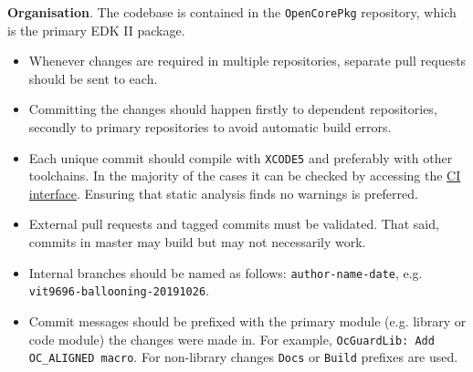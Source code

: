 \documentclass[]{article}
\providecommand{\tightlist}{%
  \setlength{\itemsep}{0pt}\setlength{\parskip}{0pt}}
\begin{document}
\textbf{Organisation}. The codebase is contained in the \texttt{OpenCorePkg} repository,
which is the primary EDK II package.
\begin{itemize}
\tightlist
\item Whenever changes are required in multiple repositories, separate pull requests should
be sent to each.
\item Committing the changes should happen firstly to dependent repositories, secondly to
primary repositories to avoid automatic build errors.
\item Each unique commit should compile with \texttt{XCODE5} and preferably with other
toolchains. In the majority of the cases it can be checked by accessing the
\href{https://travis-ci.com/acidanthera}{CI interface}. Ensuring that static analysis finds
no warnings is preferred.
\item External pull requests and tagged commits must be validated. That said, commits in
master may build but may not necessarily work.
\item Internal branches should be named as follows: \texttt{author-name-date}, e.g.
\texttt{vit9696-ballooning-20191026}.
\item Commit messages should be prefixed with the primary module (e.g. library or code module) the
changes were made in. For example, \texttt{OcGuardLib: Add OC\_ALIGNED macro}. For non-library changes
\texttt{Docs} or \texttt{Build} prefixes are used.
\end{itemize}
\end{document}
